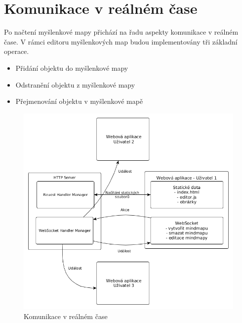 
\section{Komunikace v reálném čase}\label{sec:realTimeCommunication}

Po načtení myšlenkové mapy přichází na řadu aspekty komunikace v reálném čase. V rámci editoru myšlenkových map budou implementovány tři základní operace.
\begin{itemize}
\item Přidání objektu do myšlenkové mapy
\item Odstranění objektu z myšlenkové mapy
\item Přejmenování objektu v myšlenkové mapě
\end{itemize}

\begin{figure}[h]
\begin{centering}
\includegraphics[width	=1\textwidth]{obrazky/realtime_communication}
\par\end{centering}
\caption{Komunikace v reálném čase\label{fig:realtime_communication}}
\end{figure}

